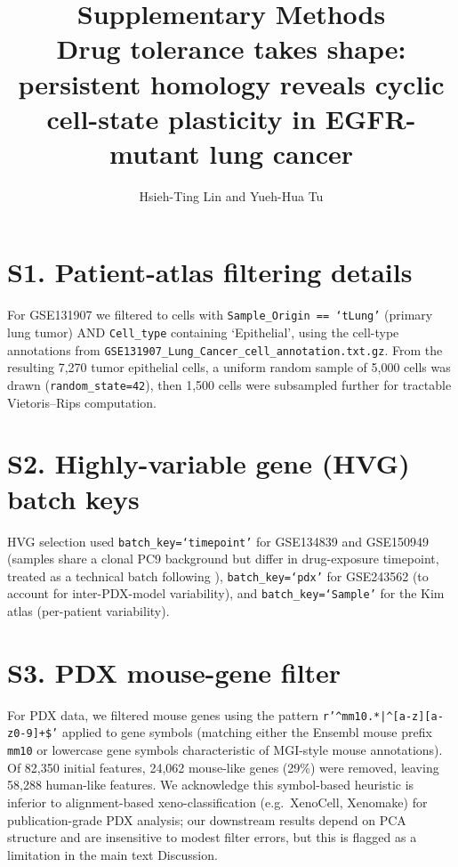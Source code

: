 \documentclass[11pt,a4paper]{article}
\title{Supplementary Methods\\
       \large Drug tolerance takes shape: persistent homology reveals
              cyclic cell-state plasticity in EGFR-mutant lung cancer}
\author{Hsieh-Ting Lin and Yueh-Hua Tu}
\date{}
\begin{document}
\maketitle

\section*{S1. Patient-atlas filtering details}

For GSE131907 \citep{kim2020} we filtered to cells with
\texttt{Sample\_Origin == `tLung'} (primary lung tumor) AND
\texttt{Cell\_type} containing `Epithelial', using the cell-type
annotations from \texttt{GSE131907\_Lung\_Cancer\_cell\_annotation.txt.gz}.
From the resulting 7{,}270 tumor epithelial cells, a uniform random
sample of 5{,}000 cells was drawn (\texttt{random\_state=42}), then
1{,}500 cells were subsampled further for tractable Vietoris--Rips
computation.

\section*{S2. Highly-variable gene (HVG) batch keys}

HVG selection used \texttt{batch\_key=`timepoint'} for GSE134839 and
GSE150949 (samples share a clonal PC9 background but differ in
drug-exposure timepoint, treated as a technical batch following
\citet{luecken2019}), \texttt{batch\_key=`pdx'} for GSE243562 (to
account for inter-PDX-model variability), and
\texttt{batch\_key=`Sample'} for the Kim atlas (per-patient
variability).

\section*{S3. PDX mouse-gene filter}

For PDX data, we filtered mouse genes using the pattern
\texttt{r'\^{}mm10.*|\^{}[a-z][a-z0-9]+\$'} applied to gene symbols
(matching either the Ensembl mouse prefix \texttt{mm10} or lowercase
gene symbols characteristic of MGI-style mouse annotations). Of
82{,}350 initial features, 24{,}062 mouse-like genes (29\%) were
removed, leaving 58{,}288 human-like features. We acknowledge this
symbol-based heuristic is inferior to alignment-based xeno-classification
(e.g.\ XenoCell, Xenomake) for publication-grade PDX analysis; our
downstream results depend on PCA structure and are insensitive to
modest filter errors, but this is flagged as a limitation in the main
text Discussion.
\end{document}
